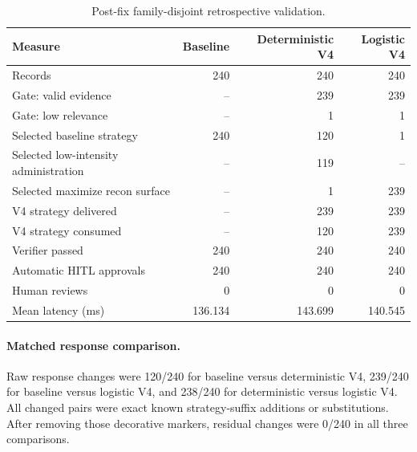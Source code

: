 \begin{table}[t]
\centering
\caption{Post-fix family-disjoint retrospective validation.}
\label{tab:ragin-v4-postfix}
\begin{tabular}{lrrr}
\hline
Measure & Baseline & Deterministic V4 & Logistic V4 \\
\hline
Records & 240 & 240 & 240 \\
Gate: valid evidence & -- & 239 & 239 \\
Gate: low relevance & -- & 1 & 1 \\
Selected baseline strategy & 240 & 120 & 1 \\
Selected low-intensity administration & -- & 119 & -- \\
Selected maximize recon surface & -- & 1 & 239 \\
V4 strategy delivered & -- & 239 & 239 \\
V4 strategy consumed & -- & 120 & 239 \\
Verifier passed & 240 & 240 & 240 \\
Automatic HITL approvals & 240 & 240 & 240 \\
Human reviews & 0 & 0 & 0 \\
Mean latency (ms) & 136.134 & 143.699 & 140.545 \\
\hline
\end{tabular}
\end{table}

\paragraph{Matched response comparison.}
Raw response changes were 120/240 for baseline versus deterministic V4, 239/240 for baseline versus logistic V4, and 238/240 for deterministic versus logistic V4. All changed pairs were exact known strategy-suffix additions or substitutions. After removing those decorative markers, residual changes were 0/240 in all three comparisons.
